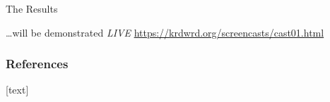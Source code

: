 \documentclass{beamer}
\begin{document}
\begin{frame}{The Results}

	\begin{block}{}
		\ldots will be demonstrated \emph{LIVE}
		\url{https://krdwrd.org/screencasts/cast01.html}
	\end{block}

\end{frame}

%

        \begin{frame}[allowframebreaks]
                \frametitle{References}

                [text]
                \footnotesize
                
                
                \nocite{*}
        \end{frame}
%
\end{document}

